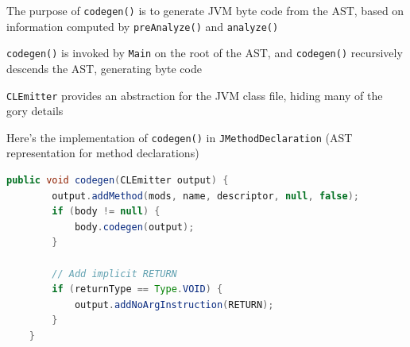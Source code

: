 \documentclass[8pt,a4paper,compress]{beamer}
\begin{document}
\begin{frame}[fragile]
\pause

The purpose of \lstinline{codegen()} is to generate JVM byte code from the AST, based on information computed by \lstinline{preAnalyze()} and \lstinline{analyze()}

\pause
\bigskip

\lstinline{codegen()} is invoked by \lstinline{Main} on the root of the AST, and \lstinline{codegen()} recursively descends the AST, generating byte code

\pause
\bigskip

\lstinline{CLEmitter} provides an abstraction for the JVM class file, hiding many of the gory details

\pause
\bigskip

Here's the implementation of \lstinline{codegen()} in \lstinline{JMethodDeclaration} (AST representation for method declarations)

\begin{lstlisting}[language=Java]
    public void codegen(CLEmitter output) {
        output.addMethod(mods, name, descriptor, null, false);
        if (body != null) {
            body.codegen(output);
        }

        // Add implicit RETURN
        if (returnType == Type.VOID) {
            output.addNoArgInstruction(RETURN);
        }
    }
\end{lstlisting}
\end{frame}
\end{document}
